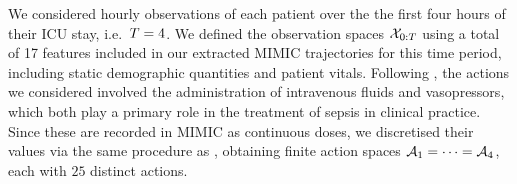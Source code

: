 


We considered hourly observations of each patient over the the first four hours of their ICU stay, i.e.\ $T = 4$.
We defined the observation spaces $\mathcal{X}_{0:T}$ using a total of 17 features included in our extracted MIMIC trajectories for this time period, including static demographic quantities and patient vitals.
Following \cite{ai-clinician}, the actions we considered involved the administration of intravenous fluids and vasopressors, which both play a primary role in the treatment of sepsis in clinical practice.
Since these are recorded in MIMIC as continuous doses, we discretised their values via the same procedure as \cite{ai-clinician}, obtaining finite action spaces $\mathcal{A}_1 = \cdots = \mathcal{A}_4$, each with $25$ distinct actions.




